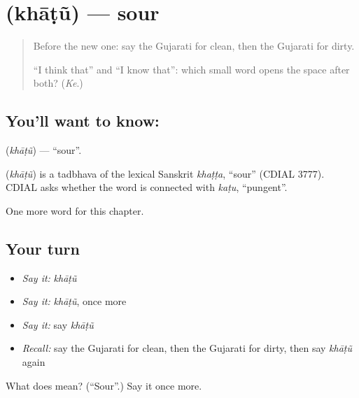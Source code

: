 \section[\texorpdfstring{\gu{ખાટું} (khāṭũ)}{ખાટું (khāṭũ)}]{ (khāṭũ) — sour}

\label{lesson:GU-C132-khatu}



\begin{quote}
Before the new one: say the Gujarati for clean, then the Gujarati for dirty.

\textquotedblleft{}I think that\textquotedblright{} and \textquotedblleft{}I know that\textquotedblright{}: which small word opens the space after both? (\emph{Ke}.)
\end{quote}

\subsection*{You'll want to know: }
\textbf{} (\emph{khāṭũ}) — \textquotedblleft{}sour\textquotedblright{}.

\begin{cousinweb}
\textbf{} (\emph{khāṭũ}) is a tadbhava of the lexical Sanskrit \emph{khaṭṭa}, \textquotedblleft{}sour\textquotedblright{} (CDIAL 3777). CDIAL asks whether the word is connected with \emph{kaṭu}, \textquotedblleft{}pungent\textquotedblright{}.
\end{cousinweb}

\begin{grammarlens}[title={What you've built}]
One more word for this chapter.
\end{grammarlens}

\subsection*{Your turn}
\begin{itemize}
\raggedright
  \item \emph{Say it:} \emph{khāṭũ}
  \item \emph{Say it:} \emph{khāṭũ}, once more
  \item \emph{Say it:} say \emph{khāṭũ}
  \item \emph{Recall:} say the Gujarati for clean, then the Gujarati for dirty, then say \emph{khāṭũ} again
\end{itemize}

\begin{tcolorbox}[breakable,colback=teal!4,colframe=teal!35!black,title={Before you move on}]
What does  mean? (\textquotedblleft{}Sour\textquotedblright{}.) Say it once more.
\end{tcolorbox}
